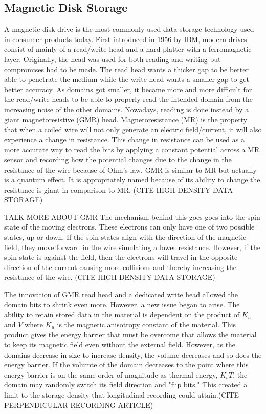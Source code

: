\documentclass[ aip, 12pt]{revtex4-1} %
\begin{document}
\subsection{Magnetic Disk Storage}
A magnetic disk drive is the most commonly used data storage technology used in consumer products today. First introduced in 1956 by IBM, modern drives consist of mainly of a read/write head and a hard platter with a ferromagnetic layer. Originally, the head was used for both reading and writing but compromises had to be made. The read head wants a thicker gap to be better able to penetrate the medium while the write head wants a smaller gap to get better accuracy. As domains got smaller, it became more and more difficult for the read/write heads to be able to properly read the intended domain from the increasing noise of the other domains. Nowadays, reading is done instead by a giant magnetoresistive (GMR) head. Magnetoresistance (MR) is the property that when a coiled wire will not only generate an electric field/current, it will also experience a change in resistance. This change in resistance can be used as a more accurate way to read the bits by applying a constant potential across a MR sensor and recording how the potential changes due to the change in the resistance of the wire because of Ohm's law. GMR is similar to MR but actually is a quantum effect. It is appropriately named because of its ability to change the resistance is giant in comparison to MR.  (CITE HIGH DENSITY DATA STORAGE) 

TALK MORE ABOUT GMR
The mechanism behind this goes goes into the spin state of the moving electrons. These electrons can only have one of two possible states, up or down. If the spin states align with the direction of the magnetic field, they move forward in the wire simulating a lower resistance. However, if the spin state is against the field, then the electrons will travel in the opposite direction of the current causing more collisions and thereby increasing the resistance of the wire. (CITE HIGH DENSITY DATA STORAGE)

The innovation of GMR read head and a dedicated write head allowed the domain bits to shrink even more. However, a new issue began to arise. The ability to retain stored data in the material is dependent on the product of $K_u$ and $V$ where $K_u$ is the magnetic anisotropy constant of the material. This product gives the energy barrier that must be overcome that allows the material to keep its magnetic field even without the external field. However, as the domains decrease in size to increase density, the volume decreases and so does the energy barrier. If the volumte of the domain decreases to the point where this energy barrier is on the same order of magnitude as thermal energy, $K_bT$, the domain may randomly switch its field direction and "flip bits." This created a limit to the storage density that longitudinal recording could attain.(CITE PERPENDICULAR RECORDING ARTICLE)
\end{document}
